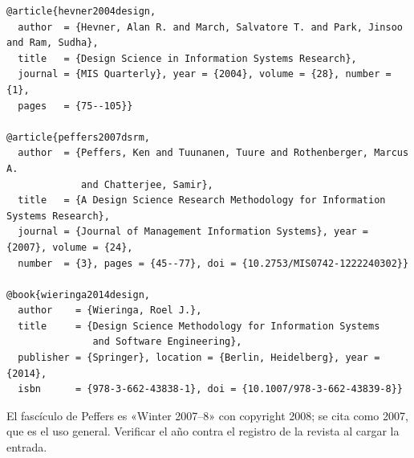 \documentclass[11pt,a4paper]{article}
\begin{document}
{\small
\begin{verbatim}
@article{hevner2004design,
  author  = {Hevner, Alan R. and March, Salvatore T. and Park, Jinsoo and Ram, Sudha},
  title   = {Design Science in Information Systems Research},
  journal = {MIS Quarterly}, year = {2004}, volume = {28}, number = {1},
  pages   = {75--105}}

@article{peffers2007dsrm,
  author  = {Peffers, Ken and Tuunanen, Tuure and Rothenberger, Marcus A.
             and Chatterjee, Samir},
  title   = {A Design Science Research Methodology for Information Systems Research},
  journal = {Journal of Management Information Systems}, year = {2007}, volume = {24},
  number  = {3}, pages = {45--77}, doi = {10.2753/MIS0742-1222240302}}

@book{wieringa2014design,
  author    = {Wieringa, Roel J.},
  title     = {Design Science Methodology for Information Systems
               and Software Engineering},
  publisher = {Springer}, location = {Berlin, Heidelberg}, year = {2014},
  isbn      = {978-3-662-43838-1}, doi = {10.1007/978-3-662-43839-8}}
\end{verbatim}}

El fascículo de Peffers es «Winter 2007--8» con copyright 2008; se cita como 2007, que es el uso general. Verificar el año contra el registro de la revista al cargar la entrada.
\end{document}
